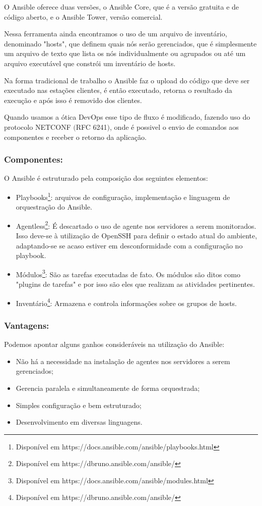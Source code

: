 O Ansible oferece duas versões, o Ansible Core, que é a versão gratuita e de código aberto, e o Ansible Tower, versão comercial.

Nessa ferramenta ainda encontramos o uso de um arquivo de inventário, denominado "hosts", que definem quais nós serão gerenciados, que é simplesmente um arquivo de texto que lista os nós individualmente ou agrupados ou até um arquivo executável que constrói um inventário de hosts.

Na forma tradicional de trabalho o Ansible faz o upload do código que deve ser executado nas estações clientes, é então executado, retorna o resultado da execução e após isso é removido dos clientes.

Quando usamos a ótica DevOps esse tipo de fluxo é modificado, fazendo uso do protocolo NETCONF $($RFC 6241$)$, onde é possivel o envio de comandos aos componentes e receber o retorno da aplicação.

\subsubsection{Componentes:}
O Ansible é estruturado pela composição dos seguintes elementos:

\begin{itemize}
	\item Playbooks\footnote{Disponível em https://docs.ansible.com/ansible/playbooks.html}: arquivos de configuração, implementação e linguagem de orquestração do Ansible.
	\item Agentless\footnote{Disponível em https://dbruno.ansible.com/ansible/}: É descartado o uso de agente nos servidores a serem monitorados. Isso deve-se à utilização de OpenSSH para definir o estado atual do ambiente, adaptando-se se acaso estiver em desconformidade com a configuração no playbook.
	\item Módulos\footnote{Disponível em https://docs.ansible.com/ansible/modules.html}: São as tarefas executadas de fato. Os módulos são ditos como "plugins de tarefas" e por isso são eles que realizam as atividades pertinentes.
	\item Inventário\footnote{Disponível em https://dbruno.ansible.com/ansible/}: Armazena e controla informações sobre os grupos de hosts.
\end{itemize}

\subsubsection{Vantagens:}
Podemos apontar alguns ganhos consideráveis na utilização do Ansible:
\begin{itemize}
	\item Não há a necessidade na instalação de agentes nos servidores a serem gerenciados;
	\item Gerencia paralela e simultaneamente de forma orquestrada; 
	\item Simples configuração e bem estruturado;
	\item Desenvolvimento em diversas linguagens.
\end{itemize}

